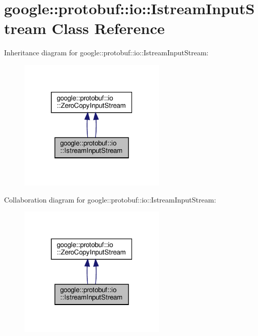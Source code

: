 \hypertarget{classgoogle_1_1protobuf_1_1io_1_1IstreamInputStream}{}\section{google\+:\+:protobuf\+:\+:io\+:\+:Istream\+Input\+Stream Class Reference}
\label{classgoogle_1_1protobuf_1_1io_1_1IstreamInputStream}


Inheritance diagram for google\+:\+:protobuf\+:\+:io\+:\+:Istream\+Input\+Stream\+:
\nopagebreak
\begin{figure}[H]
\begin{center}
\leavevmode
\includegraphics[width=199pt]{classgoogle_1_1protobuf_1_1io_1_1IstreamInputStream__inherit__graph}
\end{center}
\end{figure}


Collaboration diagram for google\+:\+:protobuf\+:\+:io\+:\+:Istream\+Input\+Stream\+:
\nopagebreak
\begin{figure}[H]
\begin{center}
\leavevmode
\includegraphics[width=199pt]{classgoogle_1_1protobuf_1_1io_1_1IstreamInputStream__coll__graph}
\end{center}
\end{figure}
